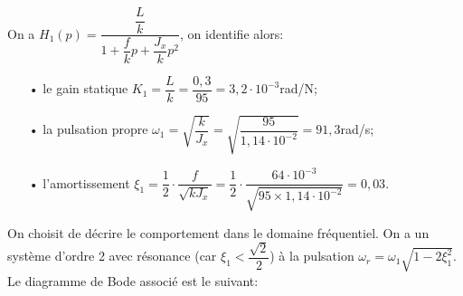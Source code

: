 \ifprof
\begin{corrige}
On a $H_1(p) = \dfrac{\dfrac{L}{k}}{1 + \dfrac{f}{k}p + \dfrac{J_x}{k}p^2}$, on identifie alors:
\begin{itemize}
\item[•] le gain statique $K_1 = \dfrac{L}{k} = \dfrac{0,3}{95} = 3,2\cdot 10^{-3}$rad/N;
\item[•] la pulsation propre $\omega_1 = \sqrt{\dfrac{k}{J_x}} = \sqrt{\dfrac{95}{1,14\cdot 10^{-2}}} = 91,3$rad/s;
\item[•] l'amortissement $\xi_1 = \dfrac{1}{2}\cdot \dfrac{f}{\sqrt{k J_x}} = \dfrac{1}{2}\cdot \dfrac{64\cdot 10^{-3}}{\sqrt{95 \times 1,14\cdot 10^{-2}}} = 0,03$. 
\end{itemize} 

On choisit de décrire le comportement dans le domaine fréquentiel. On a un système d'ordre 2 avec résonance (car $\xi_1 < \dfrac{\sqrt{2}}{2}$) à la pulsation $\omega_r = \omega_1\sqrt{1 - 2\xi_1^2}$. Le diagramme de Bode associé est le suivant:

\end{corrige}
\else
\fi


